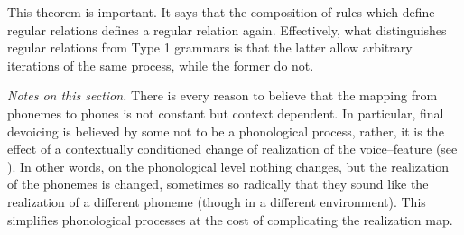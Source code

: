 This theorem is important. It says that the composition of rules
which define regular relations defines a regular relation again. 
Effectively, what distinguishes regular relations from Type 1 grammars 
is that the latter allow arbitrary iterations of the same process, 
while the former do not.

{\it Notes on this section.} 
There is every reason to believe that the mapping from 
phonemes to phones is not constant but context dependent.  
In particular, final devoicing is believed by some not to 
be a phonological process, rather, it is the effect of a 
contextually conditioned change of realization of the 
voice--feature (see \cite{portodell:voicing}). In other words, 
on the phonological level nothing changes, but the realization 
of the phonemes is changed, sometimes so radically that they 
sound like the realization of a different phoneme (though in a 
different environment). This simplifies phonological processes 
at the cost of complicating the realization map.

